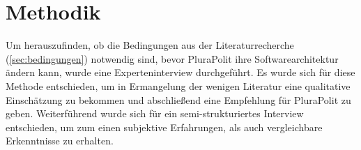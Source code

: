 \section{Methodik}
\label{sec:methodik}


Um herauszufinden, ob die Bedingungen aus der Literaturrecherche (\cref{sec:bedingungen}) notwendig sind, bevor PluraPolit ihre Softwarearchitektur ändern kann, wurde eine Experteninterview durchgeführt. Es wurde sich für diese Methode entschieden, um in Ermangelung der wenigen Literatur eine qualitative Einschätzung zu bekommen und abschließend eine Empfehlung für PluraPolit zu geben. Weiterführend wurde sich für ein semi-strukturiertes Interview entschieden, um zum einen subjektive Erfahrungen, als auch vergleichbare Erkenntnisse zu erhalten.







